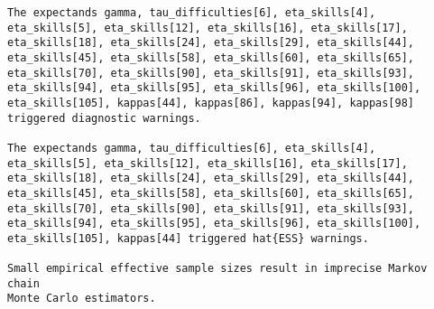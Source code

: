 \documentclass[
  letterpaper,
  DIV=11,
  numbers=noendperiod]{scrartcl}
\newenvironment{Shaded}{\begin{snugshade}}{\end{snugshade}}
\newcommand{\AttributeTok}[1]{\textcolor[rgb]{0.40,0.45,0.13}{#1}}
\newcommand{\ConstantTok}[1]{\textcolor[rgb]{0.56,0.35,0.01}{#1}}
\newcommand{\FunctionTok}[1]{\textcolor[rgb]{0.28,0.35,0.67}{#1}}
\newcommand{\NormalTok}[1]{\textcolor[rgb]{0.00,0.23,0.31}{#1}}
\newcommand{\OtherTok}[1]{\textcolor[rgb]{0.00,0.23,0.31}{#1}}
\newcommand{\SpecialCharTok}[1]{\textcolor[rgb]{0.37,0.37,0.37}{#1}}
\newcommand{\StringTok}[1]{\textcolor[rgb]{0.13,0.47,0.30}{#1}}
\begin{document}
\begin{Shaded}
\end{Shaded}

\begin{verbatim}
The expectands gamma, tau_difficulties[6], eta_skills[4],
eta_skills[5], eta_skills[12], eta_skills[16], eta_skills[17],
eta_skills[18], eta_skills[24], eta_skills[29], eta_skills[44],
eta_skills[45], eta_skills[58], eta_skills[60], eta_skills[65],
eta_skills[70], eta_skills[90], eta_skills[91], eta_skills[93],
eta_skills[94], eta_skills[95], eta_skills[96], eta_skills[100],
eta_skills[105], kappas[44], kappas[86], kappas[94], kappas[98]
triggered diagnostic warnings.

The expectands gamma, tau_difficulties[6], eta_skills[4],
eta_skills[5], eta_skills[12], eta_skills[16], eta_skills[17],
eta_skills[18], eta_skills[24], eta_skills[29], eta_skills[44],
eta_skills[45], eta_skills[58], eta_skills[60], eta_skills[65],
eta_skills[70], eta_skills[90], eta_skills[91], eta_skills[93],
eta_skills[94], eta_skills[95], eta_skills[96], eta_skills[100],
eta_skills[105], kappas[44] triggered hat{ESS} warnings.

Small empirical effective sample sizes result in imprecise Markov chain
Monte Carlo estimators.
\end{verbatim}
\end{document}
